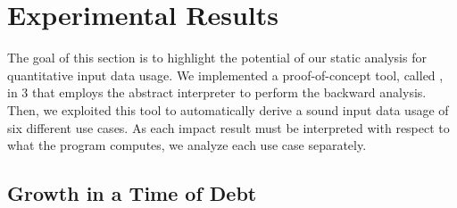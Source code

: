 \section{Experimental Results}
\newcommand*{\x}{\texttt{angle}}
\newcommand*{\y}{\texttt{speed}}
\newcommand*{\z}{\texttt{risk}}


The goal of this section is to highlight the potential of our static analysis for quantitative input data usage.
We implemented a proof-of-concept tool, called \impatto{}, in \python{} 3 that employs the \interproc{} abstract interpreter to perform the backward analysis.
Then, we exploited this tool to automatically derive a sound input data usage of six different use cases.
As each impact result must be interpreted with respect to what the program computes, we analyze each use case separately.

\subsection{Growth in a Time of Debt}


